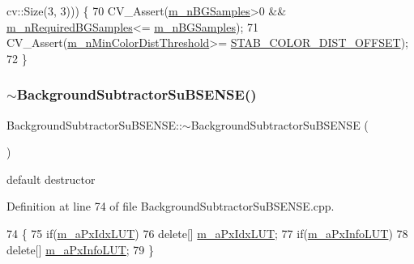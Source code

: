 \begin{DoxyCode}
      cv::Size(3, 3))) \{
70     CV\_Assert(\mbox{\hyperlink{class_background_subtractor_su_b_s_e_n_s_e_ad783b71b5b942c4018d27cf38b7d7225}{m\_nBGSamples}}>0 && \mbox{\hyperlink{class_background_subtractor_su_b_s_e_n_s_e_aca07c4307021623f9055832506cad1d6}{m\_nRequiredBGSamples}}<=
      \mbox{\hyperlink{class_background_subtractor_su_b_s_e_n_s_e_ad783b71b5b942c4018d27cf38b7d7225}{m\_nBGSamples}});
71     CV\_Assert(\mbox{\hyperlink{class_background_subtractor_su_b_s_e_n_s_e_ae0ebf701652a66bbdb0472d6f091e34d}{m\_nMinColorDistThreshold}}>=
      \mbox{\hyperlink{_background_subtractor_su_b_s_e_n_s_e_8cpp_af60b797fbe4d762be8f140d56f6d8a0a}{STAB\_COLOR\_DIST\_OFFSET}});
72 \}
\end{DoxyCode}
\mbox{\label{class_background_subtractor_su_b_s_e_n_s_e_a71cd501469582addfe4f8824cc4602d4}} 
\subsubsection{\texorpdfstring{$\sim$\+Background\+Subtractor\+Su\+B\+S\+E\+N\+S\+E()}{~BackgroundSubtractorSuBSENSE()}}
{\footnotesize\ttfamily Background\+Subtractor\+Su\+B\+S\+E\+N\+S\+E\+::$\sim$\+Background\+Subtractor\+Su\+B\+S\+E\+N\+SE (\begin{DoxyParamCaption}{ }\end{DoxyParamCaption})\hspace{0.3cm}{\ttfamily [virtual]}}



default destructor 



Definition at line 74 of file Background\+Subtractor\+Su\+B\+S\+E\+N\+S\+E.\+cpp.


\begin{DoxyCode}
74                                                             \{
75     \textcolor{keywordflow}{if}(\mbox{\hyperlink{class_background_subtractor_l_b_s_p_a06b4f0d3f24fa08bccd3c9eca085713e}{m\_aPxIdxLUT}})
76         \textcolor{keyword}{delete}[] \mbox{\hyperlink{class_background_subtractor_l_b_s_p_a06b4f0d3f24fa08bccd3c9eca085713e}{m\_aPxIdxLUT}};
77     \textcolor{keywordflow}{if}(\mbox{\hyperlink{class_background_subtractor_l_b_s_p_a74e73d4832ccdef652d93756582024db}{m\_aPxInfoLUT}})
78         \textcolor{keyword}{delete}[] \mbox{\hyperlink{class_background_subtractor_l_b_s_p_a74e73d4832ccdef652d93756582024db}{m\_aPxInfoLUT}};
79 \}
\end{DoxyCode}


